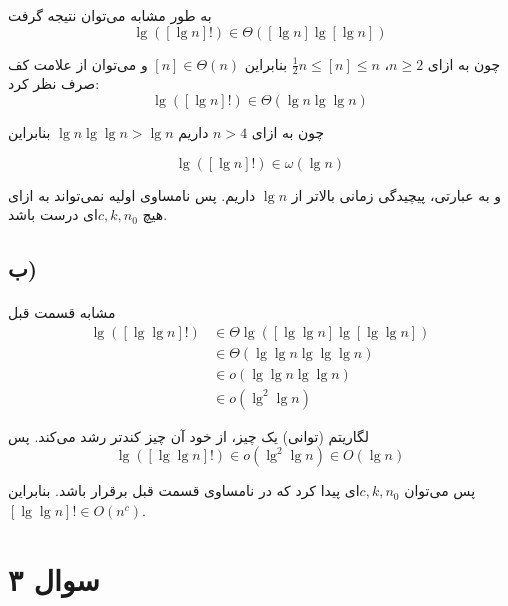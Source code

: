 \documentclass{article}
\begin{document}
	به طور مشابه می‌توان نتیجه گرفت
	\begin{equation*}
		\lg([\lg n]!) \in \Theta([\lg n] \lg [\lg n])
	\end{equation*}

	چون به ازای
	$n \ge 2$،
	$\frac{1}{2}n \le [n] \le n$
	بنابراین
	$[n] \in \Theta(n)$
	و می‌توان از علامت کف صرف نظر کرد:
	\begin{equation*}
		\lg([\lg n]!) \in \Theta(\lg n \lg \lg n)
	\end{equation*}

	چون به ازای
	$n > 4$
	داریم
	$\lg n \lg \lg n > \lg n$
	بنابراین

	\begin{equation*}
		\lg([\lg n]!) \in \omega(\lg n)
	\end{equation*}

	و به عبارتی، پیچیدگی زمانی بالاتر از $\lg n$ داریم. پس نامساوی اولیه نمی‌تواند به ازای هیچ
	$c, k, n_0$ای
	درست باشد.

	\subsection*{ب)}
	\paragraph*{}

	مشابه قسمت قبل
	\begin{align*}
		\lg ([\lg \lg n]!) &\in \Theta \lg ([\lg \lg n] \lg [\lg \lg n]) \\
		&\in \Theta(\lg \lg n \lg \lg \lg n) \\
		&\in o(\lg \lg n \lg \lg n) \\
		&\in o(\lg^2 \lg n)
	\end{align*}

	لگاریتم (توانی) یک چیز، از خود آن چیز کندتر رشد می‌کند. پس
	\begin{equation*}
		\lg ([\lg \lg n]!) \in o(\lg^2 \lg n) \in O(\lg n)
	\end{equation*}

	پس می‌توان
	$c, k, n_0$ای
	پیدا کرد که در نامساوی قسمت قبل برقرار باشد. بنابراین
	$[\lg \lg n]! \in O(n^c)$.

	\section*{سوال ۳}
	\paragraph*{}
\end{document}
